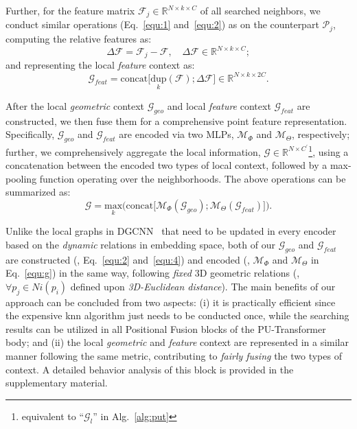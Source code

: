 Further, for the feature matrix $\mathcal{F}_j\in\mathbb{R}^{N\times k \times C}$ of all searched neighbors, we conduct similar operations (Eq.~\ref{equ:1} and~\ref{equ:2}) as on the counterpart $\mathcal{P}_j$, computing the relative features as:
\begin{equation}
\label{equ:3}
    \Delta\mathcal{F} = \mathcal{F}_j - \mathcal{F}, \quad \Delta\mathcal{F}\in\mathbb{R}^{N\times k \times C};
\end{equation}
and representing the local \emph{feature} context as:
\begin{equation}
\label{equ:4}
    \mathcal{G}_{feat} = \mathrm{concat}\big[\underset{k}{\mathrm{dup}}(\mathcal{F}); \Delta\mathcal{F}\big]\in\mathbb{R}^{N\times k \times 2C}.
\end{equation}

After the local \emph{geometric} context $\mathcal{G}_{geo}$ and local \emph{feature} context $\mathcal{G}_{feat}$ are constructed, we then fuse them for a comprehensive point feature representation. Specifically, $\mathcal{G}_{geo}$ and $\mathcal{G}_{feat}$ are encoded via two MLPs, $\bm{\mathcal{M}}_{\Phi}$ and $\bm{\mathcal{M}}_{\Theta}$, respectively; further, we comprehensively aggregate the local information, $\mathcal{G}\in\mathbb{R}^{N\times C^\prime}$\footnote{equivalent to \enquote{$\mathcal{G}_{l}$} in Alg.~\ref{alg:put}}, using a concatenation between the encoded two types of local context, followed by a max-pooling function operating over the neighborhoods. The above operations can be summarized as:
\begin{equation}
\label{equ:g}
    \mathcal{G} = \underset{k}{\mathrm{max}}\Big(\mathrm{concat}\big[\bm{\mathcal{M}}_{\Phi}(\mathcal{G}_{geo}); \bm{\mathcal{M}}_{\Theta}(\mathcal{G}_{feat})\big]\Big).
\end{equation}

Unlike the local graphs in DGCNN~\cite{wang2019dynamic} that need to be updated in every encoder based on the \emph{dynamic} relations in embedding space, both of our $\mathcal{G}_{geo}$ and $\mathcal{G}_{feat}$ are constructed (\ie, Eq.~\ref{equ:2} and~\ref{equ:4}) and encoded (\ie, $\bm{\mathcal{M}}_{\Phi}$ and $\bm{\mathcal{M}}_{\Theta}$ in Eq.~\ref{equ:g}) in the same way, following \emph{fixed} 3D geometric relations (\ie, ${\forall}p_j\in Ni(p_i)$ defined upon \emph{3D-Euclidean distance}). The main benefits of our approach can be concluded from two aspects: (i) it is practically efficient since the expensive knn algorithm just needs to be conducted once, while the searching results can be utilized in all Positional Fusion blocks of the PU-Transformer body; and (ii) the local \emph{geometric} and \emph{feature} context are represented in a similar manner following the same metric, contributing to \emph{fairly fusing} the two types of context. A detailed behavior analysis of this block is provided in the supplementary material. 

